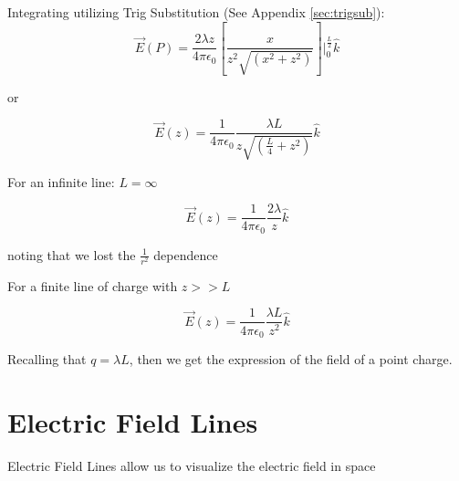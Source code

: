 \documentclass[14pt]{memoir}
\begin{document}
Integrating utilizing Trig Substitution (See Appendix \ref{sec:trigsub}):
\begin{equation}
\vec{E}(P) = \frac{2 \lambda z}{4 \pi \epsilon_0} [\frac{x}{z^2 \sqrt{(x^2 + z ^2)}}]\bigg\rvert_{0}^{\frac{L}{2}} \hat{k}
\end{equation}

or

\begin{equation}
\vec{E}(z) = \frac{1}{4 \pi \epsilon_0} \frac{\lambda L}{z \sqrt{(\frac{L}{4} + z^2)}} \hat{k}
\end{equation}

For an infinite line: $L = \infty$

\begin{equation}
\vec{E}(z) = \frac{1}{4 \pi \epsilon_0} \frac{2 \lambda}{z} \hat{k}
\end{equation}

noting that we lost the $\frac{1}{r^2}$ dependence

For a finite line of charge with $z >> L$

\begin{equation}
\vec{E}(z) = \frac{1}{4 \pi \epsilon_0} \frac{\lambda L}{z^2} \hat{k}
\end{equation}

Recalling that $q = \lambda L$, then we get the expression of the field of a point charge.



\section{Electric Field Lines}

Electric Field Lines allow us to visualize the electric field in space
\end{document}

